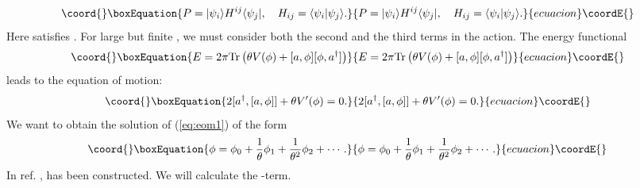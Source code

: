 \documentclass[a4paper,12pt]{article}
\begin{document}
\begin{equation}\coord{}\boxEquation{
 P=|\psi_{i}\rangle H^{ij} \langle \psi_{j}|, \quad
H_{ij}=\langle \psi_{i} | \psi_{j} \rangle.
\label{eq:proj2}
}{
 P=|\psi_{i}\rangle H^{ij} \langle \psi_{j}|, \quad
H_{ij}=\langle \psi_{i} | \psi_{j} \rangle.
}{ecuacion}\coordE{}\end{equation}
Here \coordHE{} satisfies \coordHE{}.
For large but finite \myHighlight{$\theta$}\coordHE{}, we must consider both the second and the
third
terms in the action. The energy functional
\begin{equation}\coord{}\boxEquation{
 E=2\pi {\rm Tr}\left(\theta V(\phi)+[a,\phi] [\phi,a^{\dagger}] \right)
\label{eq:ener}
}{
 E=2\pi {\rm Tr}\left(\theta V(\phi)+[a,\phi] [\phi,a^{\dagger}] \right)
}{ecuacion}\coordE{}\end{equation}
leads to the equation of motion:
\begin{equation}\coord{}\boxEquation{
 2[a^{\dagger},[a,\phi]]+\theta V'(\phi)=0.
\label{eq:eom1}
}{
 2[a^{\dagger},[a,\phi]]+\theta V'(\phi)=0.
}{ecuacion}\coordE{}\end{equation}
We want to obtain the solution of (\ref{eq:eom1}) of the
form
\begin{equation}\coord{}\boxEquation{
 \phi=\phi_{0}+{1\over\theta}\phi_{1}+{1\over\theta^2}\phi_{2}+\cdots .
\label{eq:sol1}
}{
 \phi=\phi_{0}+{1\over\theta}\phi_{1}+{1\over\theta^2}\phi_{2}+\cdots .
}{ecuacion}\coordE{}\end{equation}
In ref. \cite{HLRU},
\coordHE{} has been constructed.
We will calculate the \coordHE{}-term.
\end{document}
